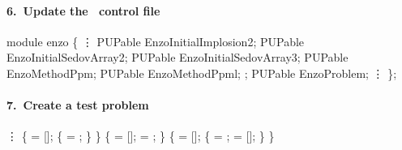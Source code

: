 
\begin{frame}[fragile] 
\secframetitle{\ssDevelMethod}
\framesubtitle{6.~Update the \charm\ control file }

\footnotesize
\begin{semiverbatim}
   module enzo \{
       \vdots
     PUPable EnzoInitialImplosion2;
     PUPable EnzoInitialSedovArray2;
     PUPable EnzoInitialSedovArray3;
     PUPable EnzoMethodPpm;
     PUPable EnzoMethodPpml;
      ;
     PUPable EnzoProblem;
       \vdots
   \};
\end{semiverbatim}
\end{frame}



\begin{frame}[fragile] 
\secframetitle{\ssDevelMethod}
\framesubtitle{7.~Create a  test problem}
\scriptsize
\vspace{-0.15in}
\begin{semiverbatim}
      \vdots
    \{
      = []; 
      \{  = ; \} 
   \}
\pause
    \{
       = [];
       = ;
   \}
\pause
    \{
       = [];
       \{
          = ;
          = [];
      \}
   \}
\end{semiverbatim}

\end{frame}


